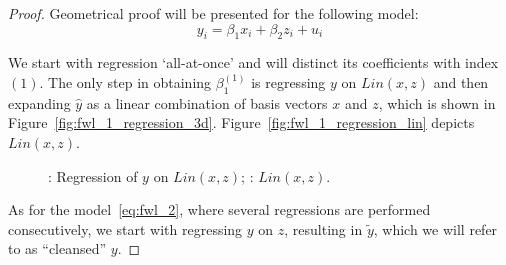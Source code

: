 \documentclass[nobib]{tufte-handout}
\theoremstyle{definition}
\begin{document}
\begin{proof}
Geometrical proof will be presented for the following model:
\begin{equation} \label{eq:fwl_proof}
y_i = \beta_1 x_i + \beta_2 z_i + u_i
\end{equation}

We start with regression `all-at-once' and will distinct its coefficients with index $(1)$. The only step in obtaining $\beta_1^{(1)}$ is regressing $y$ on $Lin(x,z)$ and then expanding $\hat y$ as a linear combination of basis vectors $x$ and $z$,
which is shown in Figure~\ref{fig:fwl_1_regression_3d}. Figure~\ref{fig:fwl_1_regression_lin} depicts $Lin(x, z)$.

\begin{figure}[ht!]
\begin{center}
\hspace{4ex}
\caption{: Regression of $y$ on $Lin(x,z)$; : $Lin(x, z)$.}
\end{center}
\end{figure}

As for the model~\ref{eq:fwl_2}, where several regressions are performed consecutively, we start with regressing $y$ on $z$, resulting in $\tilde{y}$, which we will refer to as ``cleansed'' $y$.


\end{proof}
\end{document}
